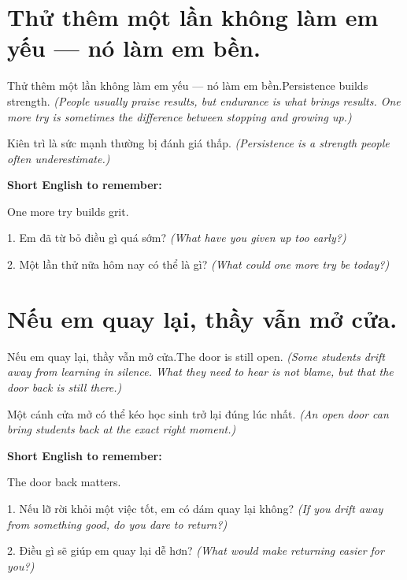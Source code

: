 \section{Thử thêm một lần không làm em yếu — nó làm em bền.}
\begin{truyen}{Thử thêm một lần không làm em yếu — nó làm em bền.}{Persistence builds strength.}
\textit{(People usually praise results, but endurance is what brings results. One more try is sometimes the difference between stopping and growing up.)}
\end{truyen}

\begin{baihoc}
Kiên trì là sức mạnh thường bị đánh giá thấp.
\textit{(Persistence is a strength people often underestimate.)}
\end{baihoc}

\begin{ghinhoanh}
\textbf{Short English to remember:}

One more try builds grit.

\end{ghinhoanh}

\begin{tuhocnhanh}
1. Em đã từ bỏ điều gì quá sớm? \textit{(What have you given up too early?)}

2. Một lần thử nữa hôm nay có thể là gì? \textit{(What could one more try be today?)}
\end{tuhocnhanh}
\ngancach


\section{Nếu em quay lại, thầy vẫn mở cửa.}
\begin{truyen}{Nếu em quay lại, thầy vẫn mở cửa.}{The door is still open.}
\textit{(Some students drift away from learning in silence. What they need to hear is not blame, but that the door back is still there.)}
\end{truyen}

\begin{baihoc}
Một cánh cửa mở có thể kéo học sinh trở lại đúng lúc nhất.
\textit{(An open door can bring students back at the exact right moment.)}
\end{baihoc}

\begin{ghinhoanh}
\textbf{Short English to remember:}

The door back matters.

\end{ghinhoanh}

\begin{tuhocnhanh}
1. Nếu lỡ rời khỏi một việc tốt, em có dám quay lại không? \textit{(If you drift away from something good, do you dare to return?)}

2. Điều gì sẽ giúp em quay lại dễ hơn? \textit{(What would make returning easier for you?)}
\end{tuhocnhanh}
\ngancach